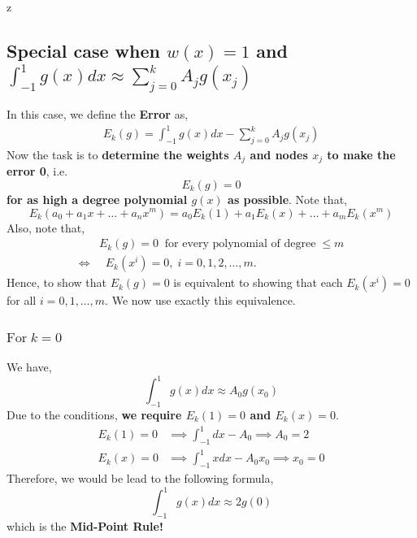 z\documentclass[a4paper,12pt,twoside]{book}
\newcommand{\nll}[0]{\newline\newline}
\begin{document}
\subsection{Special case when $w(x) = 1$ and $\int_{-1}^1 g(x) dx \approx \sum_{j=0}^k A_j g(x_j)$}
In this case, we define the \textbf{Error} as,
\begin{equation}
\begin{split}
   \boxed{ E_k(g) = \int_{-1}^1 g(x)dx - \sum_{j=0}^k A_j g(x_j)}
\end{split}
\end{equation}
Now the task is to \textbf{determine the weights $A_j$ and nodes $x_j$ to make the error 0}, i.e.
\begin{equation}
    E_k(g) = 0
\end{equation}
\textbf{for as high a degree polynomial $g(x)$ as possible}.
\nll
Note that,
\begin{equation}
    E_k(a_0 + a_1 x  + \dots + a_n x^m) = a_0E_k(1) + a_1E_k(x) + \dots + a_mE_k(x^m)
\end{equation}
Also, note that, 
\begin{equation}
\begin{split}
    &E_k(g) = 0 \;\;\text{for every polynomial of degree}\;\le m \\
    \iff& \;\;E_k(x^i) = 0,\;i=0,1,2,\dots,m.
    \end{split}
\end{equation}
Hence, to show that $E_k(g) =0 $ is equivalent to showing that each $E_k(x^i) = 0$ for all $i=0,1,\dots,m$. We now use exactly this equivalence. 
\subsubsection{$\boxed{\text{For}\; k=0}$}
We have,
\[ \int_{-1}^1 g(x)dx \approx A_0g(x_0) \]
Due to the conditions, \textbf{we require $E_k(1)= 0$ and $E_k(x) = 0$}.
\begin{equation}
\begin{split}
    E_k(1) = 0 &\implies \int_{-1}^1 dx - A_0 \implies A_0 = 2\\
    E_k(x) = 0 &\implies \int_{-1}^1xdx - A_0x_0 \implies x_0 = 0
\end{split}
\end{equation}
Therefore, we would be lead to the following formula,
\begin{equation*}
    \boxed{\int_{-1}^1 g(x)dx \approx 2g(0)}
\end{equation*}
which is the \textbf{Mid-Point Rule!}
\end{document}
